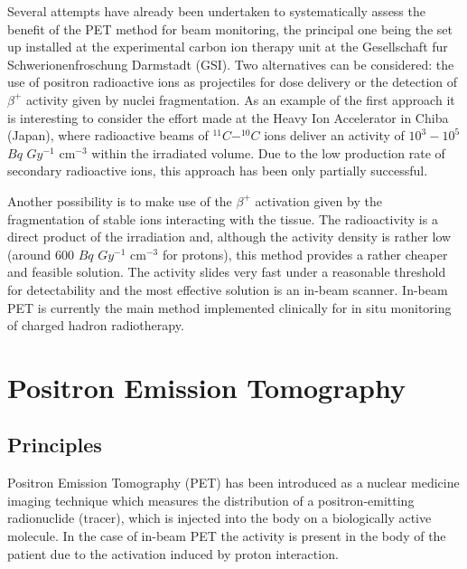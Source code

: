 Several attempts have already been undertaken to systematically assess the benefit of the PET method for beam monitoring, the principal one being the set up installed at the experimental carbon ion therapy unit at the Gesellschaft fur Schwerionenfroschung Darmstadt (GSI)\cite{Parodi2004}.
Two alternatives can be considered: the use of positron radioactive ions as projectiles for dose delivery or the detection of $\beta ^{+}$ activity given by nuclei fragmentation.
As an example of the first approach it is interesting to consider the effort made at the Heavy Ion Accelerator in Chiba (Japan), where radioactive beams of $^{11}C - ^{10}C$ ions deliver an activity of $10^{3} - 10^{5}$ $Bq$ $Gy^{-1}$ cm$^{-3}$ within the irradiated volume.
Due to the low production rate of secondary radioactive ions, this approach has been only partially successful.

Another possibility is to make use of the $\beta ^{+}$ activation given by the fragmentation of stable ions interacting with the tissue.
The radioactivity is a direct product of the irradiation and, although the activity density is rather low (around 600 $Bq$ $Gy^{-1}$ cm$^{-3}$ for protons), this method provides a rather cheaper and feasible solution\cite{Enghardt2004}.
The activity slides very fast under a reasonable threshold for detectability and the most effective solution is an in-beam scanner.
In-beam PET is currently the main method implemented clinically for in situ monitoring of charged hadron radiotherapy\cite{Crespo2007}.



\section{Positron Emission Tomography}
\subsection{Principles}
Positron Emission Tomography (PET) has been introduced as a nuclear medicine imaging technique which measures the distribution of a positron-emitting radionuclide (tracer), which is injected into the body on a biologically active molecule. In the case of in-beam PET the activity is present in the body of the patient due to the activation induced by proton interaction.

